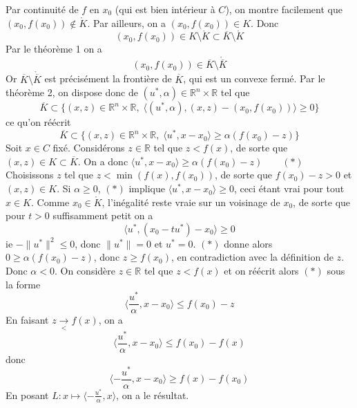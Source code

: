 \documentclass{report}
\begin{document}
\newline 
Par continuité de $f$ en $x_0$ (qui est bien intérieur à $C$), on montre facilement que $(x_0,f(x_0))\notin \mathring K$. Par ailleurs, on a $(x_0,f(x_0))\in K$. Donc $$(x_0,f(x_0))\in K\setminus \mathring K\subset \overline K \setminus \mathring K$$
Par le théorème 1 on a $$(x_0,f(x_0))\in \overline K \setminus\mathring{\overline K}$$
Or $\overline K \setminus\mathring{\overline K}$ est précisément la frontière de $\overline K$, qui est un convexe fermé.\newline
Par le théorème 2, on dispose donc de $(u^*,\alpha)\in \mathbb R^n\times\mathbb  R$ tel que 
$$\overline K \subset \{(x,z)\in \mathbb R^n\times \mathbb R, \; \langle (u^*,\alpha), (x,z)-(x_0,f(x_0)) \rangle \geq 0 \} $$
ce qu'on réécrit 
$$ \overline K \subset \{(x,z)\in \mathbb R^n\times \mathbb R, \; \langle u^*, x-x_0 \rangle \geq \alpha(f(x_0)-z) \} $$
Soit $x\in C$ fixé. Considérons $z\in \mathbb R$ tel que $z<f(x)$, de sorte que $(x,z)\in K\subset \overline K$.\newline
On a donc $\langle u^*, x-x_0 \rangle \geq \alpha(f(x_0)-z) \quad \quad(*)$\newline
Choisissons $z$ tel que $z<\min(f(x),f(x_0))$, de sorte que $f(x_0)-z>0$ et $(x,z)\in K$.\newline \newline
Si $\alpha \geq 0$, $(*)$ implique $\langle u^*, x-x_0 \rangle \geq 0$, ceci étant vrai pour tout $x\in K$.\newline
Comme $x_0\in \mathring K$, l'inégalité reste vraie sur un voisinage de $x_0$, de sorte que pour $t>0$ suffisamment petit on a 
$$ \langle u^*, (x_0-tu^*)-x_0 \rangle \geq 0$$
ie $-\|u^*\|^2\leq0$, donc $\|u^*\|=0$ et $u^*=0$. \newline
$(*)$ donne alors $0\geq \alpha(f(x_0)-z)$, donc $z\geq f(x_0)$, en contradiction avec la définition de $z$.\newline 
\newline
Donc $\alpha <0$. On considère $z\in \mathbb R$ tel que $z<f(x)$ et on réécrit alors $(*)$ sous la forme $$\langle \frac{u^*}{\alpha} ,x-x_0\rangle \leq f(x_0) -z$$
En faisant $z\xrightarrow[<]{}f(x)$, on a $$\langle \frac{u^*}{\alpha} ,x-x_0\rangle \leq f(x_0) -f(x)$$ donc 
$$\langle -\frac{u^*}{\alpha} ,x-x_0\rangle \geq f(x) -f(x_0)$$
En posant $L:x\mapsto \langle -\frac{u^*}{\alpha} ,x\rangle$, on a le résultat.
\end{document}
